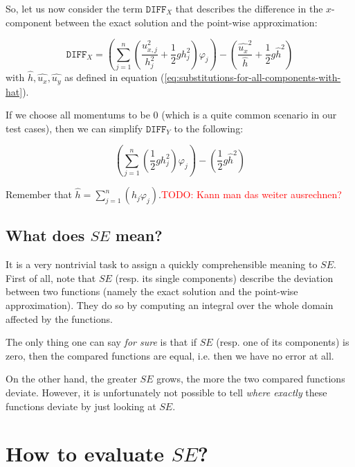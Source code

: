 \documentclass{article}
\newcommand{\todo}[1]{\textcolor{red}{TODO: #1}}
\renewcommand{\phi}{\varphi}
\begin{document}
So, let us now consider the term $\mathtt{DIFF}_X$ that describes the difference in the $x$-component between the exact solution and the point-wise approximation:

\begin{equation*}
  \mathtt{DIFF}_X = \left( \sum_{j=1}^n \left(\frac{u_{x,j}^2}{h_j^2} + \frac{1}{2} g h_j^2\right) \phi_j \right) - \left( \frac{\widehat{u_x}^2}{\widehat h} + \frac{1}{2} g \widehat{h}^2\right)
\end{equation*}
with $\widehat h, \widehat{u_x}, \widehat{u_y}$ as defined in equation (\ref{eq:substitutions-for-all-components-with-hat}).

If we choose all momentums to be 0 (which is a quite common scenario in our test cases), then we can simplify $\mathtt{DIFF}_Y$ to the following:

\begin{equation*}
  \left( \sum_{j=1}^n \left(\frac{1}{2} g h_j^2\right) \phi_j \right) - \left( \frac{1}{2} g \widehat{h}^2\right)
\end{equation*}

Remember that $\widehat{h}=\sum_{j=1}^n \left(h_j \phi_j\right)$.\todo{Kann man das weiter ausrechnen?}

\subsection{What does $SE$ mean?}
\label{sec:stiffness-analysis-what-does-se-mean}

It is a very nontrivial task to assign a quickly comprehensible meaning to $SE$. First of all, note that $SE$ (resp. its single components) describe the deviation between two functions (namely the exact solution and the point-wise approximation). They do so by computing an integral over the whole domain affected by the functions.

The only thing one can say \emph{for sure} is that if $SE$ (resp. one of its components) is zero, then the compared functions are equal, i.e. then we have no error at all.

On the other hand, the greater $SE$ grows, the more the two compared functions deviate. However, it is unfortunately not possible to tell \emph{where exactly} these functions deviate by just looking at $SE$.

\section{How to evaluate $SE$?}
\label{sec:how-to-evaluate-e}
\end{document}
